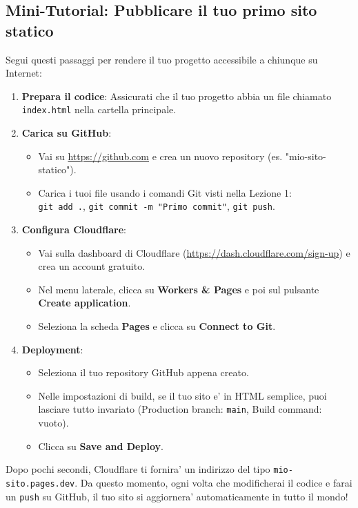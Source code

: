 \documentclass[11pt,a4paper]{report}
\begin{document}
\subsection{Mini-Tutorial: Pubblicare il tuo primo sito statico}
Segui questi passaggi per rendere il tuo progetto accessibile a chiunque su Internet:

\begin{enumerate}
    \item \textbf{Prepara il codice}: Assicurati che il tuo progetto abbia un file chiamato \texttt{index.html} nella cartella principale.
    \item \textbf{Carica su GitHub}:
    \begin{itemize}
        \item Vai su \url{https://github.com} e crea un nuovo repository (es. "mio-sito-statico").
        \item Carica i tuoi file usando i comandi Git visti nella Lezione 1: \\
        \texttt{git add .}, \texttt{git commit -m "Primo commit"}, \texttt{git push}.
    \end{itemize}
    \item \textbf{Configura Cloudflare}:
    \begin{itemize}
        \item Vai sulla dashboard di Cloudflare (\url{https://dash.cloudflare.com/sign-up}) e crea un account gratuito.
        \item Nel menu laterale, clicca su \textbf{Workers \& Pages} e poi sul pulsante \textbf{Create application}.
        \item Seleziona la scheda \textbf{Pages} e clicca su \textbf{Connect to Git}.
    \end{itemize}
    \item \textbf{Deployment}:
    \begin{itemize}
        \item Seleziona il tuo repository GitHub appena creato.
        \item Nelle impostazioni di build, se il tuo sito e' in HTML semplice, puoi lasciare tutto invariato (Production branch: \texttt{main}, Build command: vuoto).
        \item Clicca su \textbf{Save and Deploy}.
    \end{itemize}
\end{enumerate}

Dopo pochi secondi, Cloudflare ti fornira' un indirizzo del tipo \texttt{mio-sito.pages.dev}. Da questo momento, ogni volta che modificherai il codice e farai un \texttt{push} su GitHub, il tuo sito si aggiornera' automaticamente in tutto il mondo!
\end{document}
